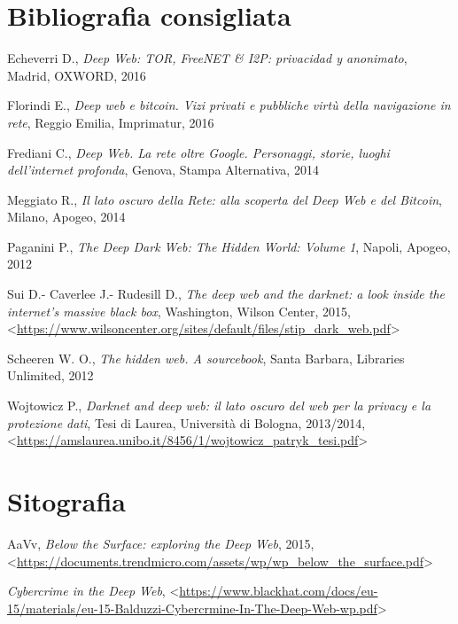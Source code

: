 \documentclass[
  b5paper,
  twoside,
  11pt,
  chapterprefix=false,
  bibliography=totocnumbered,
  parskip=0]{scrbook}
\begin{document}
\hypertarget{bibliografia-consigliata-11}{%
\section*{Bibliografia consigliata}\label{bibliografia-consigliata-11}}

Echeverri D., \emph{Deep Web: TOR, FreeNET \& I2P: privacidad y anonimato},
Madrid, OXWORD, 2016

Florindi E., \emph{Deep web e bitcoin. Vizi privati e pubbliche virtù della
navigazione in rete}, Reggio Emilia, Imprimatur, 2016

Frediani C., \emph{Deep Web. La rete oltre Google. Personaggi, storie, luoghi
dell'internet profonda}, Genova, Stampa Alternativa, 2014

Meggiato R., \emph{Il lato oscuro della Rete: alla scoperta del Deep Web e
del Bitcoin}, Milano, Apogeo, 2014

Paganini P., \emph{The Deep Dark Web: The Hidden World: Volume 1}, Napoli,
Apogeo, 2012

Sui D.- Caverlee J.- Rudesill D., \emph{The deep web and the darknet: a look
inside the internet's massive black box}, Washington, Wilson Center,
2015,
\textless{}\href{https://www.wilsoncenter.org/sites/default/files/stip_dark_web.pdf}{{https://www.wilsoncenter.org/sites/default/files/stip\_dark\_web.pdf}}\textgreater{}

Scheeren W. O., \emph{The hidden web. A sourcebook}, Santa Barbara, Libraries
Unlimited, 2012

Wojtowicz P., \emph{Darknet and deep web: il lato oscuro del web per la
privacy e la protezione dati}, Tesi di Laurea, Università di Bologna,
2013/2014,
\textless{}{\url{https://amslaurea.unibo.it/8456/1/wojtowicz_patryk_tesi.pdf}\textgreater{}}

\hypertarget{sitografia-16}{%
\section*{Sitografia}\label{sitografia-16}}

AaVv, \emph{Below the Surface: exploring the Deep Web}, 2015,
\textless{}\href{https://documents.trendmicro.com/assets/wp/wp_below_the_surface.pdf}{{https://documents.trendmicro.com/assets/wp/wp\_below\_the\_surface.pdf}}\textgreater{}

\emph{Cybercrime in the Deep Web},
\textless{}{\url{https://www.blackhat.com/docs/eu-15/materials/eu-15-Balduzzi-Cybercrmine-In-The-Deep-Web-wp.pdf}\textgreater{}}
\end{document}
